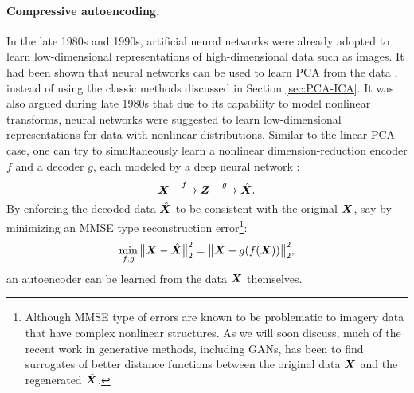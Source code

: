 \documentclass[../../book-main.tex]{subfiles}
\begin{document}
\paragraph{Compressive autoencoding.}
In the late 1980s and 1990s, artificial neural networks were already adopted to learn low-dimensional representations of high-dimensional data such as images. It had been shown that neural networks can be used to learn PCA from the data \cite{Oja1982SimplifiedNM,Baldi89}, instead of using the classic methods discussed in Section \ref{sec:PCA-ICA}. It was also argued during late 1980s that due to its capability to model nonlinear transforms, neural networks were suggested to learn low-dimensional representations for data with nonlinear distributions. Similar to the linear PCA case, one can try to simultaneously learn a nonlinear dimension-reduction encoder $f$ and a decoder $g$, each modeled by a deep neural network  \cite{Rumelhart1986,Kramer1991NonlinearPC}:
\begin{equation}
    \bm{X}   \xrightarrow{\hspace{2mm} f \hspace{2mm}} \bm{Z}  \xrightarrow{\hspace{2mm} g \hspace{2mm}} \hat {\bm{X}}.
       \label{eqn:auto-encoding-deep-networks}
\end{equation}
By enforcing the decoded data $\hat {\bm{X}}$ to be consistent with the original $\bm{X}$, say by minimizing an MMSE type reconstruction error\footnote{Although MMSE type of errors are known to be problematic to imagery data that have complex nonlinear structures. As we will soon discuss, much of the recent work in generative methods, including GANs, has been to find surrogates of better distance functions between the original data $\bm{X}$ and the regenerated $\hat {\bm{X}}$.}:
\begin{equation}
    \min_{f,g} \big\|\bm{X} - \hat {\bm{X}}\big\|_2^2 = \big\|\bm{X} - g(f( \bm{X}))\big\|_2^2,
\end{equation}
an autoencoder can be learned from the data $\bm{X}$ themselves. 
\end{document}
